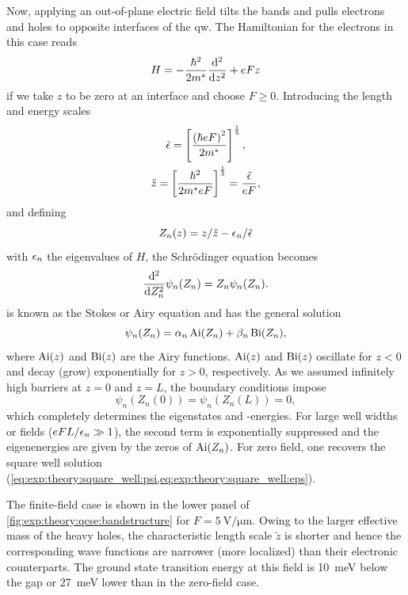 Now, applying an out-of-plane electric field tilts the bands and pulls electrons and holes to opposite interfaces of the \gls{qw}.
The Hamiltonian for the electrons in this case reads~\cite{Rabinovitch1971,Miller1985,Davies2009}
\begin{equation}\label{eq:exp:theory:qcse:hamiltonian}
    H = -\frac{\hbar^2}{2m^\ast}\dv[2]{z} + eFz
\end{equation}
if we take $z$ to be zero at an interface and choose $F \geq 0$.
Introducing the length and energy scales~\cite{Davies2009}
\begin{gather}
    \tilde{\epsilon} = \left[\frac{\left(\hbar eF\right)^2}{2m^\ast}\right]^{\frac{1}{3}}, \\
    \tilde{z} = \left[\frac{\hbar^2}{2m^\ast eF}\right]^{\frac{1}{3}} = \frac{\tilde{\epsilon}}{eF},
\end{gather}
and defining
\begin{equation}
    Z_n(z) = z/\tilde{z} - \epsilon_n/\tilde{\epsilon}
\end{equation}
with $\epsilon_n$ the eigenvalues of $H$, the Schrödinger equation becomes~\cite{Rabinovitch1971}
\begin{equation}\label{eq:exp:theory:qcse:se}
    \dv[2]{Z_n}\psi_n(Z_n) = Z_n\psi_n(Z_n).
\end{equation}
 is known as the Stokes or Airy equation and has the general solution
\begin{equation}
    \psi_n(Z_n) = \alpha_n\operatorname{Ai}(Z_n) + \beta_n\operatorname{Bi}(Z_n),
\end{equation}
where $\operatorname{Ai}(z)$ and $\operatorname{Bi}(z)$ are the Airy functions.
$\operatorname{Ai}(z)$ and $\operatorname{Bi}(z)$ oscillate for $z < 0$ and decay (grow) exponentially for $z > 0$, respectively.
As we assumed infinitely high barriers at $z = 0$ and $z = L$, the boundary conditions impose
\begin{equation}
    \psi_n(Z_n(0)) = \psi_n(Z_n(L)) = 0,
\end{equation}
which completely determines the eigenstates and -energies.
For large well widths or fields ($eFL/\epsilon_n\gg 1$), the second term is exponentially suppressed and the eigenenergies are given by the zeros of $\operatorname{Ai}(Z_n)$.
For zero field, one recovers the square well solution (\cref{eq:exp:theory:square_well:psi,eq:exp:theory:square_well:eps}).

The finite-field case is shown in the lower panel of \cref{fig:exp:theory:qcse:bandstructure} for $F=\qty{5}{\volt\per\micro\meter}$.
Owing to the larger effective mass of the heavy holes, the characteristic length scale $\tilde{z}$ is shorter and hence the corresponding wave functions are narrower (more localized) than their electronic counterparts.
The ground state transition energy at this field is \qty{10}{\milli\electronvolt} below the gap or \qty{27}{\milli\electronvolt} lower than in the zero-field case.


